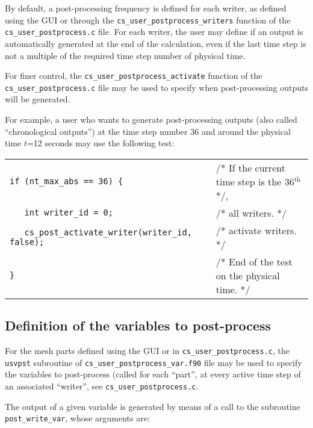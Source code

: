 {{{By default, a post-processing frequency is defined for each writer,
as defined using the GUI or through the
\texttt{cs\_user\_postprocess\_writers}
function of the \texttt{cs\_user\_postprocess.c} file. For each writer,
the user may define if an output is automatically generated at the end
of the calculation, even if the last time step is not a multiple of the
required time step number of physical time.

For finer control, the \texttt{cs\_user\_postprocess\_activate} function of the
\texttt{cs\_user\_postprocess.c} file may be used to specify when
post-processing outputs will be generated.

For example, a user who wants to generate post-processing outputs (also
called ``chronological outputs'') at
the time step number 36 and around the physical time $t$=12 seconds may
use the following test:\\

\begin{tabular}{ll}
\mbox{\texttt{if (nt\_max\_abs == 36) \{}}
                    & /* If the current time step is the 36$^{\text{th}}$ */,\\
\mbox{\texttt{~~~int writer\_id = 0;}}
                    & /* all writers. */ \\
\mbox{\texttt{~~~cs\_post\_activate\_writer(writer\_id, false);}}
                    & /* activate writers. */ \\
\mbox{\texttt{\}}}
                    & /* End of the test on the physical time. */ \\
\end{tabular}

\subsection{Definition of the variables to post-process}

For the mesh parts defined using the GUI or in \texttt{cs\_user\_postprocess.c},
the \texttt{usvpst} subroutine  of \texttt{cs\_user\_postprocess\_var.f90} file
may be used to specify the variables to
post-process (called for each ``part'', at every active time step of an
associated ``writer'', see \texttt{cs\_user\_postprocess.c}.

The output of a given variable is generated by means of a call to the subroutine
\texttt{post\_write\_var}, whose arguments are:

}}}
